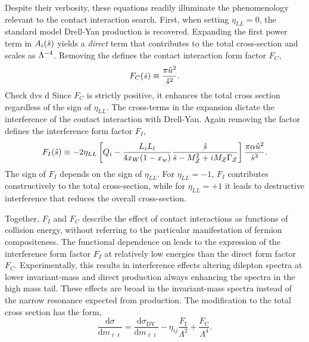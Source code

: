 Despite their verbosity, these equations readily illuminate the phenomenology relevant to the contact interaction search.
First, when setting $\eta_{LL}=0$, the standard model Drell-Yan production is recovered.
Expanding the first power term in $A_i(\hat{s})$ yields a \emph{direct} term that contributes to the total cross-section and scales as $\Lambda^{-4}$.
Removing the \lam defines the contact interaction form factor $F_C$,
\begin{equation}\begin{split}
    F_C(\hat{s}) \equiv \frac{\pi\hat{u}^2}{\hat{s}^2}.
\end{split}\end{equation} 
{\color{red} Check d\that vs d\mll}
Since $F_C$ is strictly positive, it enhances the total \qqll cross section regardless of the sign of $\eta_{LL}$.
The cross-terms in the expansion dictate the interference of the contact interaction with Drell-Yan.
Again removing the \lam factor defines the interference form factor $F_I$,
\begin{equation}\begin{split}
    F_I(\hat{s}) \equiv -2\eta_{LL}\left[Q_i-\frac{L_iL_l}{4x_W(1-x_w)}\frac{\hat{s}}{\hat{s}-M_Z^2+iM_Z\Gamma_Z}\right]\frac{\pi\alpha\hat{u}^2}{\hat{s}^3}.
\end{split}\end{equation} 
The sign of $F_I$ depends on the sign of $\eta_{LL}$.
For $\eta_{LL}=-1$, $F_I$ contributes constructively to the total cross-section, while for $\eta_{LL}=+1$ it leads to destructive interference that reduces the overall cross-section.

Together, $F_I$ and $F_C$ describe the effect of contact interactions as functions of collision energy, without referring to the particular manifestation of fermion compositeness.
The functional dependence on \shat leads to the expression of the interference form factor $F_I$ at relatively low energies than the direct form factor $F_C$.
Experimentally, this results in interference effects altering dilepton spectra at lower invariant-mass and direct production always enhancing the spectra in the high mass tail.
These effects are broad in the invariant-mass spectra instead of the narrow resonance expected from \hmm production.
The modification to the total cross section has the form,
\begin{equation}\label{eqn:cixsPheno}
\frac{\text{d}\sigma}{\text{d}m_{\ell\ell}} = \frac{\text{d}\sigma_\textrm{DY}}{\text{d}m_{\ell\ell}} - \eta_{ij}\frac{F_\textrm{I}}{\Lambda^2} + \frac{F_\textrm{C}}{\Lambda^4}.
\end{equation}

